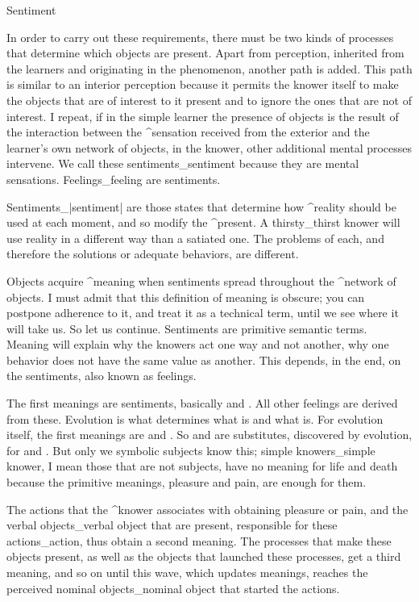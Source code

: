\Section Sentiment

In order to carry out these requirements, there must be two kinds of
processes that determine which objects are present. Apart from
perception, inherited from the learners and originating in the
phenomenon, another path is added. This path is similar to an interior
perception because it permits the knower itself to make the objects that
are of interest to it present and to ignore the ones that are not of
interest. I repeat, if in the simple learner the presence of objects is
the result of the interaction between the ^{sensation} received from the
exterior and the learner's own network of objects, in the knower, other
additional mental processes intervene. We call these
sentiments_{sentiment} because they are mental sensations.
Feelings_{feeling} are sentiments.

Sentiments_|sentiment| are those states that determine how ^{reality}
should be used at each moment, and so modify the ^{present}. A
thirsty_{thirst} knower will use reality in a different way than a
satiated one. The problems of each, and therefore the solutions or
adequate behaviors, are different.

Objects acquire ^{meaning} when sentiments spread throughout the
^{network of objects}. I must admit that this definition of meaning is
obscure; you can postpone adherence to it, and treat it as a technical
term, until we see where it will take us. So let us continue. Sentiments
are primitive semantic terms. Meaning will explain why the knowers act
one way and not another, why one behavior does not have the same value
as another. This depends, in the end, on the sentiments, also known as
feelings.

The first meanings are sentiments, basically  and
. All other feelings are derived from these.
Evolution is what determines what  is and what
 is. For evolution itself, the first meanings are
 and . So  and
 are substitutes, discovered by evolution,
for  and . But only we symbolic subjects
know this; simple knowers_{simple knower}, I mean those that are not
subjects, have no meaning for life and death because the primitive
meanings, pleasure and pain, are enough for them.

The actions that the ^{knower} associates with obtaining pleasure or
pain, and the verbal objects_{verbal object} that are present,
responsible for these actions_{action}, thus obtain a second meaning.
The processes that make these objects present, as well as the objects
that launched these processes, get a third meaning, and so on until this
wave, which updates meanings, reaches the perceived nominal
objects_{nominal object} that started the actions.

